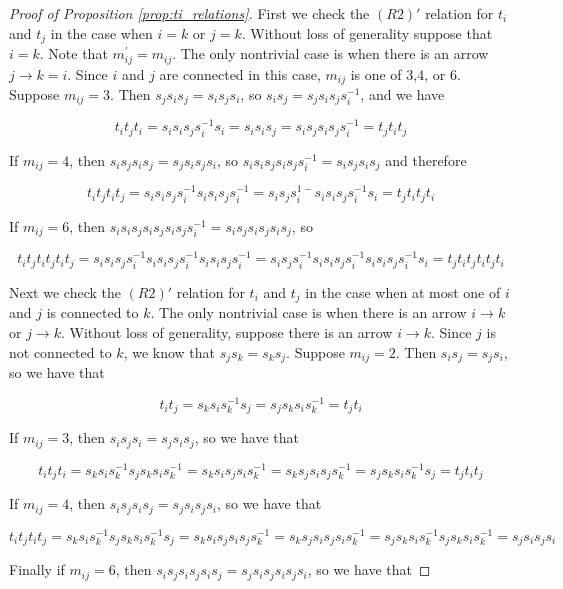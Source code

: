 \documentclass[11pt]{amsart}
\theoremstyle{definition}
\begin{document}
\begin{proof}[Proof of Proposition \ref{prop:ti_relations}]
First we check the $(R2)'$ relation for $t_i$ and $t_j$ in the case when $i=k$ or $j=k$.  Without loss of generality suppose that $i=k$.  Note that $m_{ij}^\prime = m_{ij}$.  The only nontrivial case is when there is an arrow $j\rightarrow k =i$.  Since $i$ and $j$ are connected in this case, $m_{ij}$ is one of 3,4, or 6.  Suppose $m_{ij} = 3$.  Then $s_js_is_j = s_is_js_i$, so $s_is_j = s_js_is_js_i^{-1}$, and we have

$$t_it_jt_i = s_is_is_js_i^{-1}s_i = s_is_is_j = s_is_js_is_js_i^{-1} = t_jt_it_j$$

\noindent If $m_{ij} = 4$, then $s_is_js_is_j = s_js_is_js_i$, so $s_is_is_js_is_js_i^{-1} = s_is_js_is_j$ and therefore

$$t_it_jt_it_j = s_is_is_js_i^{-1}s_is_is_js_i^{-1} = s_is_js_i^{1-}s_is_is_js_i^{-1}s_i = t_jt_it_jt_i$$

\noindent If $m_{ij} = 6$, then $s_is_is_js_is_js_is_js_i^{-1} = s_is_js_is_js_is_j$, so 

$$t_it_jt_it_jt_it_j = s_is_is_js_i^{-1}s_is_is_js_i^{-1}s_is_is_js_i^{-1} = s_is_js_i^{-1}s_is_is_js_i^{-1}s_is_is_js_i^{-1}s_i = t_jt_it_jt_it_jt_i$$

Next we check the $(R2)'$ relation for $t_i$ and $t_j$ in the case when at most one of $i$ and $j$ is connected to $k$.  The only nontrivial case is when there is an arrow $i\rightarrow k$ or $j\rightarrow k$.  Without loss of generality, suppose there is an arrow $i\rightarrow k$.  Since $j$ is not connected to $k$, we know that $s_js_k = s_ks_j$.  Suppose $m_{ij} = 2$.  Then $s_is_j = s_js_i$, so we have that

$$t_it_j = s_ks_is_k^{-1}s_j = s_js_ks_is_k^{-1} = t_jt_i$$

\noindent If $m_{ij} = 3$, then $s_is_js_i = s_js_is_j$, so we have that 

$$t_it_jt_i = s_ks_is_k^{-1}s_js_ks_is_k^{-1} = s_ks_is_js_is_k^{-1} = s_ks_js_is_js_k^{-1} = s_js_ks_is_k^{-1}s_j = t_jt_it_j$$

\noindent If $m_{ij} = 4$, then $s_is_js_is_j = s_js_is_js_i$, so we have that

$$t_it_jt_it_j = s_ks_is_k^{-1}s_js_ks_is_k^{-1}s_j = s_ks_is_js_is_js_k^{-1} = s_ks_js_is_js_is_k^{-1} = s_js_ks_is_k^{-1}s_js_ks_is_k^{-1} = s_js_is_js_i$$

\noindent Finally if $m_{ij} = 6$, then $s_is_js_is_js_is_j = s_js_is_js_is_js_i$, so we have that


\end{proof}
\end{document}
